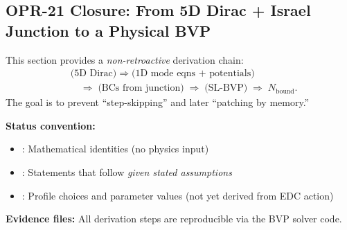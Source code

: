 
\subsection{OPR-21 Closure: From 5D Dirac + Israel Junction to a Physical BVP}
\label{subsec:opr21_closure}


\begin{tcolorbox}[edcGuardrail, title=\textbf{Epistemic Contract: Learning-Style Derivation}]
This section provides a \emph{non-retroactive} derivation chain:
\begin{align*}
&\text{(5D Dirac)} \;\Rightarrow\; \text{(1D mode eqns + potentials)} \\
&\quad\Rightarrow\; \text{(BCs from junction)} \;\Rightarrow\; \text{(SL-BVP)} \;\Rightarrow\; N_{\text{bound}}.
\end{align*}
The goal is to prevent ``step-skipping'' and later ``patching by memory.''

\textbf{Status convention:}
\begin{itemize}[nosep]
    \item \tagM{}: Mathematical identities (no physics input)
    \item \tagDc{}: Statements that follow \emph{given stated assumptions}
    \item \tagP{}: Profile choices and parameter values (not yet derived from EDC action)
\end{itemize}

\textbf{Evidence files:} All derivation steps are reproducible via the BVP solver code.
\end{tcolorbox}


